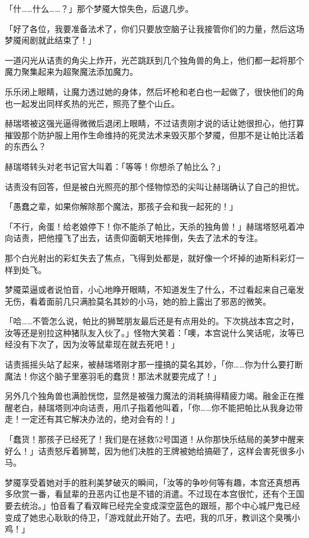「什……什么……？」那个梦魇大惊失色，后退几步。

「好了各位，我要准备法术了，你们只要放空脑子让我接管你们的力量，然后这场梦魇闹剧就此结束了！」

一道闪光从诘责的角尖上炸开，光芒跳跃到几个独角兽的角上，他们都一起将那个魔力聚集起来为超聚魔法添加魔力。

乐乐闭上眼睛，让魔力透过她的身体，然后坏枪和老白也一起做了，很快他们的角也一起发出同样炙热的光芒，照亮了整个山丘。

赫瑞塔被这强光逼得微微后退闭上眼睛，不过诘责刚才说的话让她很担心，他打算摧毁那个防护服上用作生命维持的死灵法术来毁灭那个梦魇，但那不是让帕比活着的东西么？

赫瑞塔转头对老书记官大叫着：「等等！你想杀了帕比么？」

诘责没有回答，但是被白光照亮的那个怪物惊恐的尖叫让赫瑞确认了自己的担忧。

「愚蠢之辈，如果你解除那个魔法，那孩子会和我一起死的！」

「不行，肏蛋！给老娘停下！你不能杀了帕比，天杀的独角兽！」赫瑞塔怒吼着冲向诘责，把他撞飞了出去，诘责仰面朝天地摔倒，失去了法术的专注。

那个白光射出的彩虹失去了焦点，飞得到处都是，就好像一个坏掉的迪斯科彩灯一样到处飞。

梦魇菜逼或者说怕音，小心地睁开眼睛，不知道发生了什么，不过看起来自己毫发无伤，看着面前几只满脸莫名其妙的小马，她的脸上露出了邪恶的微笑。

「哈……不管怎么说，帕比的狮鹫朋友最后还是有点用处的。下次挑战本宫之时，汝等还是别拉这种猪队友入伙了。」怪物大笑着：「噢，本宫说什么笑话呢，汝等已经没有下次了，因为汝等鼠辈现在就去死吧！」

诘责摇摇头站了起来，被赫瑞塔刚才那一撞搞的莫名其妙，「你……你为什么要打断魔法！你这个脑子里塞羽毛的蠢货！那法术就要完成了！」

另外几个独角兽也满脸恍惚，显然是被强力魔法的消耗搞得精疲力竭。融金正在推醒老白，赫瑞塔则冲向诘责，用爪子指着他叫着，「你……你不能把帕比从我身边带走！一定还有其它解决办法的，绝对会有的！」

「蠢货！那孩子已经死了！我们是在拯救52号国道！从你那快乐结局的美梦中醒来好么！」诘责怒斥着狮鹫，因为他们决胜的王牌被她给搞砸了，这样会害死很多小马。

梦魇享受着她对手的胜利美梦破灭的瞬间，「汝等的争吵何等有趣，本宫还真想再多欣赏一番，看鼠辈的丑恶内讧也是不错的消遣。不过现在本宫很忙，还有个王国要去统治。」怕音看了看双眸已经完全变成深空蓝色的跟班，那个中心城尸鬼已经变成了她忠心耿耿的侍卫，「游戏就此开始了。去吧，我的爪牙，教训这个臭嘴小鸡！」

